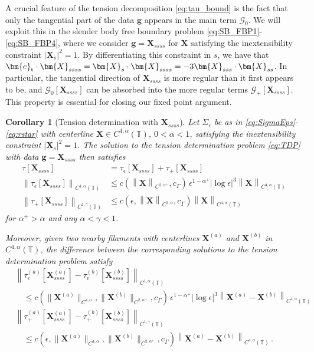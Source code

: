 \documentclass[11pt,reqno]{amsart}
\newcommand{\T}{\mathbb{T}}
\newcommand{\X}{\bm{X}}
\newcommand{\be}{\bm{e}}
\newcommand{\abs}[1]{\left\lvert #1 \right\rvert}
\newcommand{\norm}[1]{\left\lVert #1 \right\rVert}
\newcommand{\mc}[1]{\mathcal{#1}}
\newtheorem{corollary}[theorem]{Corollary}
\theoremstyle{definition}
\begin{document}
A crucial feature of the tension decomposition \eqref{eq:tau_bound} is the fact that only the tangential part of the data $\bm{g}$ appears in the main term $\mc{G}_0$. We will exploit this in the slender body free boundary problem \eqref{eq:SB_FBP1}-\eqref{eq:SB_FBP4}, where we consider $\bm{g}=\X_{ssss}$ for $\X$ satisfying the inextensibility constraint $\abs{\X_s}^2=1$. By differentiating this constraint in $s$, we have that $\be_{\rm t}\cdot\X_{ssss}=\X_s\cdot\X_{ssss}=-3\X_{sss}\cdot\X_{ss}$. In particular, the tangential direction of $\X_{ssss}$ is more regular than it first appears to be, and $\mc{G}_0[\X_{ssss}]$ can be absorbed into the more regular terms $\mc{G}_+[\X_{ssss}]$. This property is essential for closing our fixed point argument. 
%
%
\begin{corollary}[Tension determination with $\X_{ssss}$]\label{cor:TDP_Xssss}
Let $\Sigma_\epsilon$ be as in \eqref{eq:SigmaEps}-\eqref{eq:rstar} with centerline $\X\in C^{4,\alpha}(\T)$, $0<\alpha<1$, satisfying the inextensibility constraint $\abs{\X_s}^2=1$. The solution to the tension determination problem \eqref{eq:TDP} with data $\bm{g}=\X_{ssss}$ then satisfies
\begin{equation}\label{eq:tauXssss}
\begin{aligned}
  \tau[\X_{ssss}] &= \tau_\epsilon[\X_{ssss}] + \tau_+[\X_{ssss}]\\
  \norm{\tau_\epsilon[\X_{ssss}]}_{C^{1,\alpha}(\T)} &\le c(\norm{\X}_{C^{2,\alpha^+}},c_\Gamma)\,\epsilon^{1-\alpha^+}\abs{\log\epsilon}^3\norm{\X}_{C^{4,\alpha}(\T)}\\
  \norm{\tau_+[\X_{ssss}]}_{C^{1,\gamma}(\T)} &\le c(\epsilon,\norm{\X}_{C^{3,\alpha}},c_\Gamma)\norm{\X}_{C^{4,\alpha}(\T)}
\end{aligned}
\end{equation}
for $\alpha^+>\alpha$ and any $\alpha<\gamma<1$. 

Moreover, given two nearby filaments with centerlines $\X^{(a)}$ and $\X^{(b)}$ in $C^{4,\alpha}(\T)$, the difference between the corresponding solutions to the tension determination problem satisfy 
\begin{equation}\label{eq:tauXssss_lip}
\begin{aligned}
  &\norm{\tau_\epsilon^{(a)}[\X_{ssss}^{(a)}]-\tau_\epsilon^{(b)}[\X_{ssss}^{(b)}]}_{C^{1,\alpha}(\T)} \\
  &\quad\le c(\|\X^{(a)}\|_{C^{4,\alpha}},\|\X^{(b)}\|_{C^{2,\alpha^+}},c_\Gamma)\,\epsilon^{1-\alpha^+}\abs{\log\epsilon}^3\norm{\X^{(a)}-\X^{(b)}}_{C^{4,\alpha}(\T)}\\
  &\norm{\tau_+^{(a)}[\X_{ssss}^{(a)}]-\tau_+^{(b)}[\X_{ssss}^{(b)}]}_{C^{1,\gamma}(\T)} \\
  &\quad \le c(\epsilon,\|\X^{(a)}\|_{C^{4,\alpha}},\|\X^{(b)}\|_{C^{2,\alpha^+}},c_\Gamma)\norm{\X^{(a)}-\X^{(b)}}_{C^{4,\alpha}(\T)}\,.
\end{aligned}
\end{equation}
%
\end{corollary}
\end{document}
